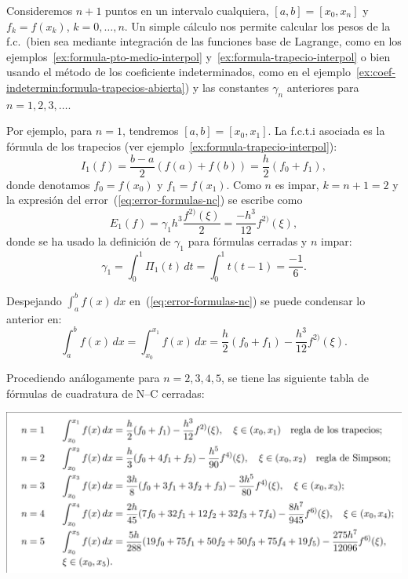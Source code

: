\begin{example}
  \label{ex:fc-NC-cerradas}
  Consideremos $n+1$ puntos en un intervalo cualquiera,
  $[a,b]=[x_{0},x_{n}]$ y $f_k=f(x_k)$, $k=0,\dots,n$. Un simple
  cálculo nos permite calcular los pesos de la f.c.\ (bien sea mediante
  integración de las funciones base de Lagrange, como en los
  ejemplos~\ref{ex:formula-pto-medio-interpol}
  y~\ref{ex:formula-trapecio-interpol} o bien usando el método de los
  coeficiente indeterminados, como en el
  ejemplo~\ref{ex:coef-indetermin:formula-trapecios-abierta}) y las
  constantes $\gamma_n$ anteriores para $n=1,2,3,\dots$.

  Por ejemplo, para $n=1$, tendremos $[a,b]=[x_0,x_1]$. La f.c.t.i
  asociada es la fórmula de los trapecios (ver
  ejemplo~\ref{ex:formula-trapecio-interpol}):
  \begin{equation*}
    I_1(f) = \frac{b-a}{2}(f(a)+f(b))
    = \frac{h}{2}(f_0+f_1),
  \end{equation*}
  donde denotamos $f_0=f(x_0)$ y $f_1=f(x_1)$. Como $n$ es impar, $k=n+1=2$ y la expresión
  del error~(\ref{eq:error-formulas-nc}) se escribe como
  \begin{equation*}
    E_1(f)=\gamma_1 h^{3}\frac{f^{2)}(\xi)}{2}=\frac{-h^3}{12} f^{2)}(\xi),
  \end{equation*}
  donde se ha usado la definición de $\gamma_1$ para fórmulas cerradas
  y $n$ impar:
  \begin{equation*}
    \gamma_1 = \int_0^1 \Pi_1(t)\,dt = \int_0^1 t(t-1) = \frac{-1}{6}.
  \end{equation*}

  Despejando $\int_a^b f(x)\,dx$ en~(\ref{eq:error-formulas-nc}) se
  puede condensar lo anterior en:
  \begin{equation*}
    \int_a^b f(x)\,dx = \int_{x_0}^{x_1} f(x)\,dx =
    \frac{h}{2}(f_0+f_1) - \frac{h^3}{12} f^{2)}(\xi).
  \end{equation*}

  Procediendo análogamente para $n=2,3,4,5$, se tiene las
  siguiente tabla de fórmulas de cuadratura de N--C cerradas:
  \begin{center}
    \includegraphics[width=0.95\linewidth]{tema3/formulas-nc-cerradas}
  \end{center}
\end{example}

